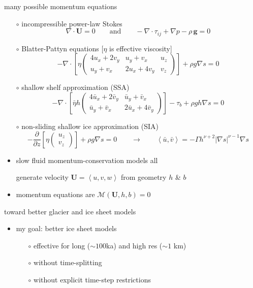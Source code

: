 \documentclass[xcolor={dvipsnames}]{beamer}
\newcommand\bU{\mathbf{U}}
\newcommand\Div{\nabla\cdot}
\newcommand\grad{\nabla}
\newcommand{\ip}[2]{\ensuremath{\left<#1,#2\right>}}
\begin{document}
\begin{frame}{many possible momentum equations}

  \begin{itemize}
  \scriptsize
  \item[$\circ$] incompressible power-law Stokes
\begin{equation*}
  \nabla \cdot \bU = 0 \qquad \text{and} \qquad - \nabla \cdot \tau_{ij} + \nabla p - \rho\, \mathbf{g} = 0
\end{equation*}
  \item[$\circ$] Blatter-Pattyn equations [$\eta$ is effective viscosity]
$$-\Div \left[\eta \begin{pmatrix}
4 u_x+2v_y & u_y+v_x   & u_z \\
u_y+v_x    & 2u_x+4v_y & v_z
\end{pmatrix} \right] + \rho g \grad s = 0$$
  \item[$\circ$] shallow shelf approximation (SSA)
$$-\Div \left[\bar \eta h \begin{pmatrix}
4 \bar u_x+2\bar v_y & \bar u_y+\bar v_x   \\
\bar u_y+\bar v_x    & 2\bar u_x+4\bar v_y
\end{pmatrix} \right] - \tau_b + \rho g h \grad s = 0$$
  \item[$\circ$] non-sliding shallow ice approximation (SIA)
$$-\frac{\partial}{\partial z} \left[\eta \begin{pmatrix}
u_z \\
v_z
\end{pmatrix} \right] + \rho g \grad s = 0
\qquad \to \qquad
\ip{\bar u}{\bar v} = -\Gamma h^{\nu+2} |\grad s|^{\nu-1} \grad s$$
  \end{itemize}

\begin{itemize}
\item slow fluid momentum-conservation models all
\begin{center}
\alert{generate velocity $\bU=\left<u,v,w\right>$ from geometry $h$ \& $b$}
\end{center}
\item momentum equations are $\mathcal{M}(\bU,h,b)=0$
\end{itemize}
\end{frame}


\begin{frame}{toward better glacier and ice sheet models}

\begin{itemize}
\item my goal: better ice sheet models 
  \begin{itemize}
  \item[$\circ$] effective for long ($\sim 100$ka) and high res ($\sim 1$ km) 
  \item[$\circ$] without time-splitting 
  \item[$\circ$] without explicit time-step restrictions 
  \end{itemize}
\end{itemize}
\end{frame}
\end{document}
